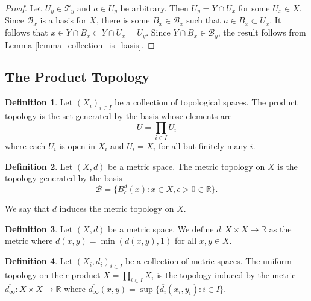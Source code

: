 \documentclass{article}
\theoremstyle{definition}
\newtheorem{definition}{Definition}[subsection]
\theoremstyle{remark}
\newcommand{\R}{\mathbb{R}}
\newcommand{\set}[1]{\{#1\}}
\newcommand{\prt}[1]{\mathcal{#1}}
\let\oldmin\min
\renewcommand{\min}[1]{\oldmin \left( #1 \right)}
\begin{document}
\begin{proof}
    Let $U_y \in \prt{T}_y$ and $a \in U_y$ be arbitrary. Then $U_y = Y \cap U_x$ for some $U_x \in X$. Since $\prt{B}_x$ is a basis for $X$, there is some $B_x \in \prt{B}_x$ such that $a \in B_x \subset U_x$. It follows that $x \in Y \cap B_x \subset Y \cap U_x = U_y$. Since $Y \cap B_x \in \prt{B}_y$, the result follows from Lemma \ref{lemma_collection_is_basis}.
\end{proof}

\setcounter{subsection}{18}
\subsection{The Product Topology}

\begin{definition} \label{def_productTopology}
    Let $(X_i)_{i \in I}$ be a collection of topological spaces. The product topology is the set generated by the basis whose elements are 
    \begin{equation*}
        U = \prod_{i\in I} U_i
    \end{equation*} where each $U_i$ is open in $X_i$ and $U_i = X_i$ for all but finitely many $i$.
\end{definition}

\begin{definition} \label{def_metricTopology}
    Let $(X, d)$ be a metric space. The metric topology on $X$ is the topology generated by the basis 
    \begin{equation*}
        \prt{B} = \set{B_{\epsilon}^d(x) : x \in X, \epsilon > 0 \in \R}.
    \end{equation*}
    
    We say that $d$ induces the metric topology on $X$.
\end{definition}

\begin{definition}
    Let $(X, d)$ be a metric space. We define $\overline{d}: X \times X \to \R$ as the metric where $\overline{d}(x, y) = \min{d(x, y), 1}$ for all $x,y \in X$.
\end{definition}


\begin{definition}
   Let $(X_i, d_i)_{i \in I}$ be a collection of metric spaces. The uniform topology on their product $X = \prod_{i \in I} X_i$ is the topology induced by the metric $\overline{d_\infty}: X \times X \to \R$ where $\overline{d_\infty}(x, y) = \sup\set{\overline{d_i}(x_i, y_i) : i \in I}$.
\end{definition}
\end{document}
